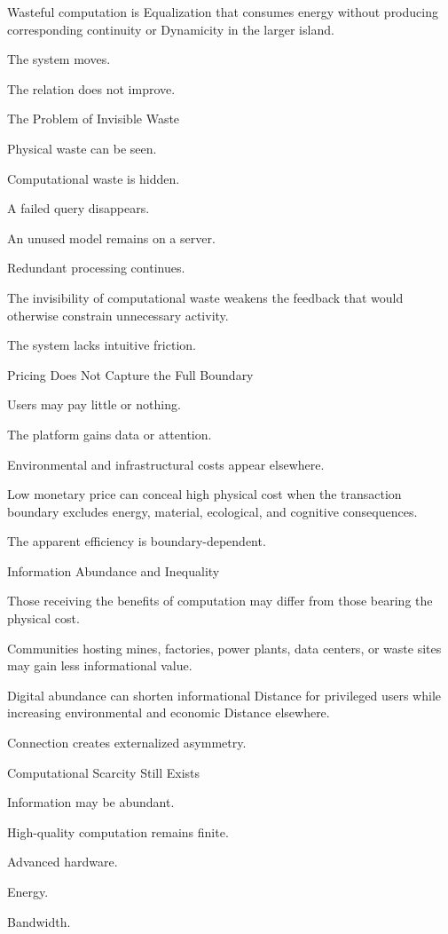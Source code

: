 Wasteful computation is Equalization that consumes energy without producing corresponding continuity or Dynamicity in the larger island.

The system moves.

The relation does not improve.

The Problem of Invisible Waste

Physical waste can be seen.

Computational waste is hidden.

A failed query disappears.

An unused model remains on a server.

Redundant processing continues.

The invisibility of computational waste weakens the feedback that would otherwise constrain unnecessary activity.

The system lacks intuitive friction.

Pricing Does Not Capture the Full Boundary

Users may pay little or nothing.

The platform gains data or attention.

Environmental and infrastructural costs appear elsewhere.

Low monetary price can conceal high physical cost when the transaction boundary excludes energy, material, ecological, and cognitive consequences.

The apparent efficiency is boundary-dependent.

Information Abundance and Inequality

Those receiving the benefits of computation may differ from those bearing the physical cost.

Communities hosting mines, factories, power plants, data centers, or waste sites may gain less informational value.

Digital abundance can shorten informational Distance for privileged users while increasing environmental and economic Distance elsewhere.

Connection creates externalized asymmetry.

Computational Scarcity Still Exists

Information may be abundant.

High-quality computation remains finite.

Advanced hardware.

Energy.

Bandwidth.

